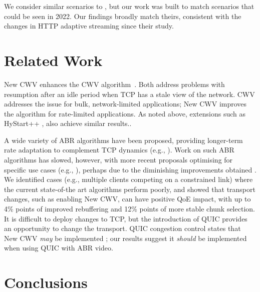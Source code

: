 \documentclass[10pt,sigconf]{acmart}
\begin{document}
We consider similar scenarios to \cite{Nazir-2014-performance-evaluation-congestion-window-validation-dash-newcwv}, but our work was built to match scenarios that could be seen in 2022. Our findings broadly match theirs, consistent with the changes in HTTP adaptive streaming since their study.

\section{Related Work}
\label{sec:related}

New CWV enhances the CWV algorithm~\cite{rfc2861-2000-padhye-congestion-window-validation}.
Both address problems with resumption after
an idle period when TCP has a stale view of the network. CWV
addresses the issue for bulk, network-limited applications; New CWV improves
the algorithm for rate-limited applications.
As noted above, extensions such as HyStart++ \cite{draft-ietf-tcpm-hystartplusplus}, 
also achieve similar results..

A wide variety of ABR algorithms have been proposed, providing longer-term rate
adaptation to complement TCP dynamics (e.g., \cite{Sun-2016-cs2p,Jiang-2012-improving-fairness-http-video-festive,Spiteri-2016-BOLA,Huang-2015-A-buffer-based-approach-to-rate-adaptation-bba,Spiteri-2019-from-theory-to-practice-sabre,Wang-2016-squad}).
Work on such ABR algorithms has slowed, however, with more recent proposals optimising for specific use cases (e.g., \cite{Karagkioules-2020-achieving-low-latency}), perhaps due to the diminishing improvements obtained \cite{Yin-2015-a-control-theoritic-approach}. We identified cases (e.g., multiple clients competing on a constrained link) where the current state-of-the art algorithms perform poorly, and showed that transport changes, such as enabling New CWV, can have positive QoE impact, with up to 4\% points of improved rebuffering and 12\% points of more stable chunk selection. 
It is difficult to deploy changes to TCP, but the introduction of QUIC \cite{RFC9000}
provides an opportunity to change the transport. QUIC congestion control states that 
New CWV \emph{may} be implemented \cite{RFC9002}; our results suggest it \emph{should}
be implemented when using QUIC with ABR video.

\section{Conclusions}
\label{sec:conclusion}
\end{document}
